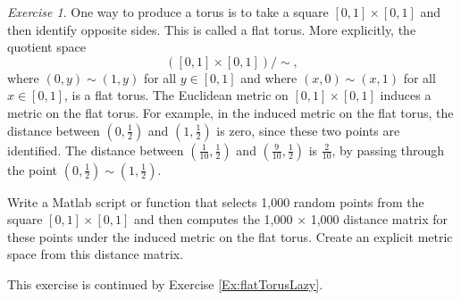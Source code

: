 \documentclass[amscd, amssymb, verbatim]{amsart}[12pt]
\theoremstyle{remark}
\newtheorem{exercise}{Exercise}
\theoremstyle{remark}
\theoremstyle{remark}
\begin{document}

\begin{exercise}\label{Ex:flatTorus}
One way to produce a torus is to take a square $[0, 1] \times [0, 1]$ and then identify opposite sides. This is called a flat torus. More explicitly, the quotient space
$$([0, 1] \times [0, 1]) / \sim,$$
where $(0, y) \sim (1, y)$ for all $y \in [0, 1]$ and where $(x, 0) \sim (x, 1)$ for all $x \in [0, 1]$, is a flat torus. The Euclidean metric on $[0, 1] \times [0, 1]$ induces a metric on the flat torus. For example, in the induced metric on the flat torus, the distance between $(0, \frac{1}{2})$ and $(1, \frac{1}{2})$ is zero, since these two points are identified. The distance between $(\frac{1}{10}, \frac{1}{2})$ and $(\frac{9}{10}, \frac{1}{2})$ is $\frac{2}{10}$, by passing through the point $(0, \frac{1}{2}) \sim (1, \frac{1}{2})$.

Write a Matlab script or function that selects 1,000 random points from the square $[0, 1] \times [0, 1]$ and then computes the 1,000 $\times$ 1,000 distance matrix for these points under the induced metric on the flat torus. Create an explicit metric space from this distance matrix. 

This exercise is continued by Exercise \ref{Ex:flatTorusLazy}. 

\end{exercise}
\end{document}
